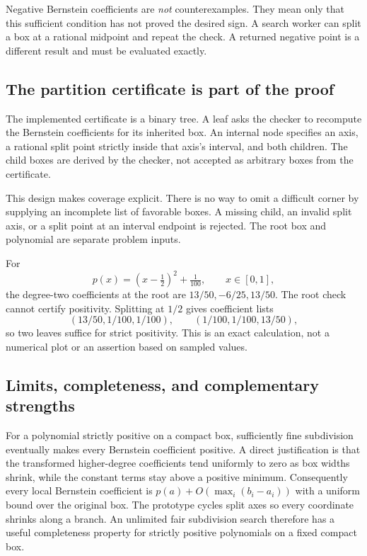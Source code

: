 Negative Bernstein coefficients are \emph{not} counterexamples. They mean
only that this sufficient condition has not proved the desired sign. A
search worker can split a box at a rational midpoint and repeat the check.
A returned negative point is a different result and must be evaluated exactly.

\subsection{The partition certificate is part of the proof}

The implemented certificate is a binary tree. A leaf asks the checker to
recompute the Bernstein coefficients for its inherited box. An internal node
specifies an axis, a rational split point strictly inside that axis's
interval, and both children. The child boxes are derived by the checker, not
accepted as arbitrary boxes from the certificate.

This design makes coverage explicit. There is no way to omit a difficult
corner by supplying an incomplete list of favorable boxes. A missing child,
an invalid split axis, or a split point at an interval endpoint is rejected.
The root box and polynomial are separate problem inputs.

For
\[
p(x)=\left(x-\tfrac12\right)^2+\tfrac1{100},\qquad x\in[0,1],
\]
the degree-two coefficients at the root are
$13/50,-6/25,13/50$. The root check cannot certify positivity. Splitting at
$1/2$ gives coefficient lists
\[
(13/50,1/100,1/100),\qquad(1/100,1/100,13/50),
\]
so two leaves suffice for strict positivity. This is an exact calculation,
not a numerical plot or an assertion based on sampled values.

\subsection{Limits, completeness, and complementary strengths}

For a polynomial strictly positive on a compact box, sufficiently fine
subdivision eventually makes every Bernstein coefficient positive. A direct
justification is that the transformed higher-degree coefficients tend
uniformly to zero as box widths shrink, while the constant terms stay above
a positive minimum. Consequently every local Bernstein coefficient is
$p(a)+O(\max_i(b_i-a_i))$ with a uniform bound over the original box.
The prototype cycles split axes so every coordinate shrinks along a branch.
An unlimited fair subdivision search therefore has a useful completeness
property for strictly positive polynomials on a fixed compact box.

